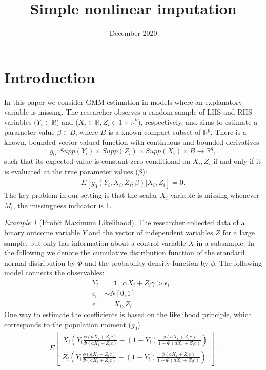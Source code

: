 \documentclass{article}
\title{Simple nonlinear imputation}
\author{}
\date{December 2020}
\theoremstyle{definition}
\theoremstyle{remark}
\newtheorem{example}{Example}
\begin{document}
\maketitle

\onehalfspacing


\section{Introduction}
In this paper we consider GMM estimation in models where an explanatory variable is missing. The researcher observes a random sample of LHS and RHS variables ($Y_i \in \mathbb{R}$) and ($X_i \in \mathbb{R},Z_i \in {1} \times \mathbb{R}^k$), respectively, and aims to estimate a parameter value $\beta \in B$, where $B$ is a known compact subset of $\mathbb{R}^p$. There is a known, bounded vector-valued function with continuous and bounded derivatives
\[g_0: Supp(Y_i) \times Supp(Z_i) \times Supp(X_i) \times B \rightarrow \mathbb{R}^q,
\]
such that its expected value is constant zero conditional on $X_i, Z_i$ if and only if it is evaluated at the true parameter values ($\beta$):
\begin{align}
E[g_0(Y_i, X_i, Z_i;\beta)|X_i,Z_i] = 0.
\end{align}
The key problem in our setting is that the scalar $X_i$ variable is missing whenever $M_i$, the missingness indicator is 1.

\begin{example}[Probit Maximum Likelihood]
	The researcher collected data of a binary outcome variable $Y$ and the vector of independent variables $Z$ for a large sample, but only has information about a control variable $X$ in a subsample. In the following we denote the cumulative distribution function of the standard normal distribution by $\Phi$ and the probability density function by $\phi$. The following model connects the observables:
	\begin{align}
	Y_i&= \mathbf{1}[\alpha X_i + Z_i\gamma>\epsilon_i] \label{eq_probitStruc}\\
	\epsilon_i&\sim N[0,1] \label{eq_probitFunc} \\
	\epsilon &\perp X_i,Z_i \label{eq_probitExog}
	\end{align}
	One way to estimate the coefficients is based on the likelihood principle, which corresponds to the population moment ($g_0$)
	\begin{align*}
	E\left[\begin{array}{c}
	X_i\left(Y_i \frac{\phi(aX_i+Z_ic)}{\Phi(aX_i+Z_ic)} - (1-Y_i)\frac{\phi(aX_i+Z_ic)}{1-\Phi(aX_i+Z_ic)}\right) \\
	Z_i\left(Y_i \frac{\phi(aX_i+Z_ic)}{\Phi(aX_i+Z_ic)} - (1-Y_i)\frac{\phi(aX_i+Z_ic)}{1-\Phi(aX_i+Z_ic)}\right)
	\end{array}
	\right].
	\end{align*}
\end{example}
\end{document}
